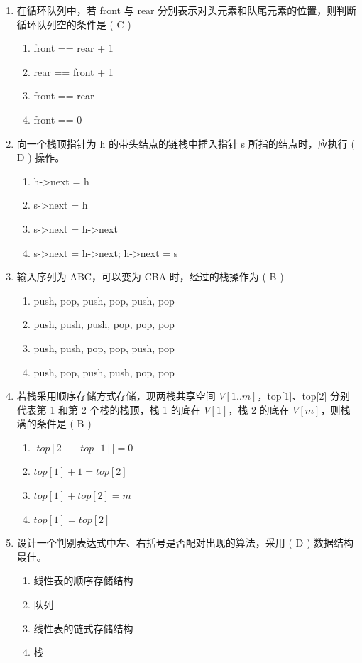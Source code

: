 \documentclass[12pt, a4paper]{article}
\begin{document}
\begin{enumerate}[label=\arabic*.]
    \item 在循环队列中，若 front 与 rear 分别表示对头元素和队尾元素的位置，则判断循环队列空的条件是 ( C )
    \begin{enumerate}
        \item front == rear + 1
        \item rear == front + 1
        \item front == rear
        \item front == 0
    \end{enumerate}

    \item 向一个栈顶指针为 h 的带头结点的链栈中插入指针 s 所指的结点时，应执行 ( D ) 操作。
    \begin{enumerate}
        \item h->next = h
        \item s->next = h
        \item s->next = h->next
        \item s->next = h->next; h->next = s
    \end{enumerate}

    \item 输入序列为 ABC，可以变为 CBA 时，经过的栈操作为 ( B )
    \begin{enumerate}
        \item push, pop, push, pop, push, pop
        \item push, push, push, pop, pop, pop
        \item push, push, pop, pop, push, pop
        \item push, pop, push, push, pop, pop
    \end{enumerate}

    \item 若栈采用顺序存储方式存储，现两栈共享空间 $V[1..m]$，top[1]、top[2] 分别代表第 1 和第 2 个栈的栈顶，栈 1 的底在 $V[1]$，栈 2 的底在 $V[m]$，则栈满的条件是 ( B )
    \begin{enumerate}
        \item $|top[2] - top[1]| = 0$
        \item $top[1] + 1 = top[2]$
        \item $top[1] + top[2] = m$
        \item $top[1] = top[2]$
    \end{enumerate}

    \item 设计一个判别表达式中左、右括号是否配对出现的算法，采用 ( D ) 数据结构最佳。
    \begin{enumerate}
        \item 线性表的顺序存储结构
        \item 队列
        \item 线性表的链式存储结构
        \item 栈
    \end{enumerate}


\end{enumerate}
\end{document}
